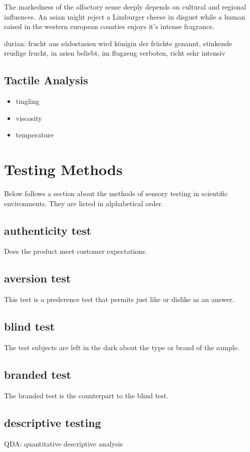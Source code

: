 \documentclass[]{scrartcl}
\begin{document}
The markedness of the olfactory sense deeply depends on cultural and regional influences.
An asian might reject a Limburger cheese in disgust while a human raised in the western european
counties enjoys it's intense fragrance.

durian: frucht aus südostasien wird königin der früchte genannt,
stinkende reudige frucht, in asien beliebt, im flugzeug verboten, richt sehr intensiv

\subsection{Tactile Analysis}
\begin{itemize}
  \item tingling
  \item viscosity
  \item temperature
\end{itemize}


\section{Testing Methods}
Below follows a section about the methods of sensory testing in scientific environments.
They are listed in alphabetical order.
\subsection{authenticity test}
Does the product meet customer expectations.

\subsection{aversion test}
This test is a prederence test that permits just like or dislike as an answer.

\subsection{blind test}
The test subjects are left in the dark about the type or brand of the sample.

\subsection{branded test}
The branded test is the counterpart to the blind test.

\subsection{descriptive testing}
QDA: quantitative descriptive analysis
\end{document}

